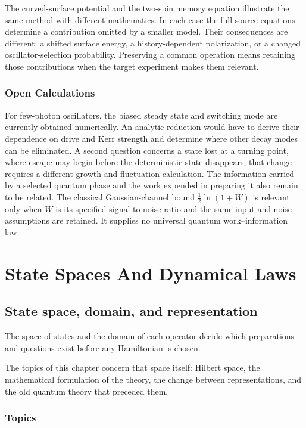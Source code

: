 \documentclass[11pt,oneside]{book}
\begin{document}
The curved-surface potential and the two-spin memory
equation illustrate the same method with different
mathematics. In each case the full source equations
determine a contribution omitted by a smaller model.
Their consequences are different: a shifted surface
energy, a history-dependent polarization, or a changed
oscillator-selection probability. Preserving a common
operation means retaining those contributions when the
target experiment makes them relevant.

\section{Open Calculations}
For few-photon oscillators, the biased steady state and
switching mode are currently obtained numerically.
An analytic reduction would have to derive their
dependence on drive and Kerr strength and determine
where other decay modes can be eliminated. A second
question concerns a state lost at a turning point,
where escape may begin before the deterministic state
disappears; that change requires a different growth
and fluctuation calculation. The information carried
by a selected quantum phase and the work expended in
preparing it also remain to be related. The classical
Gaussian-channel bound \(\tfrac12\ln(1+W)\) is relevant
only when \(W\) is its specified signal-to-noise ratio
and the same input and noise assumptions are retained.
It supplies no universal quantum work--information law.


\part{State Spaces And Dynamical Laws}

\chapter{State space, domain, and representation}

The space of states and the domain of each operator decide which preparations and questions exist before any Hamiltonian is chosen.

The topics of this chapter concern that space itself: Hilbert space, the mathematical formulation of the theory, the change between representations, and the old quantum theory that preceded them.

\section*{Topics}
\end{document}
